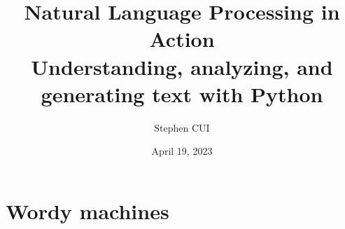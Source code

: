 \documentclass[openany]{book}
\title{\textbf{Natural Language Processing in Action}\\
Understanding, analyzing, and generating text with Python
}
\author{Stephen CUI}
\date{April 19, 2023}
\begin{document}
\maketitle
\part{Wordy machines}

\end{document}
